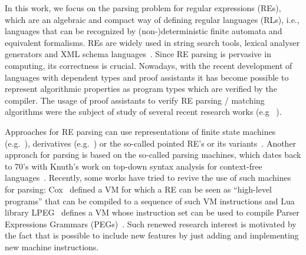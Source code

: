 \documentclass[review]{elsarticle}
\theoremstyle{definition}
\begin{document}
In this work, we focus on the parsing problem for regular expressions (REs), which are an algebraic
and compact way of defining regular languages (RLs), i.e., languages that can be recognized by
(non-)deterministic finite automata and equivalent formalisms. REs are widely used in string search
tools, lexical analyser generators and XML schema languages~\cite{Frisch2004}. Since RE parsing
is pervasive in computing, its correctness is crucial. Nowadays, with the recent
development of languages with dependent types and proof assistants it has become
possible to represent algorithmic properties as program types which are verified
by the compiler. The usage of proof assistants to verify RE parsing / matching algorithms
were the subject of study of several recent research works (e.g ~\cite{Firsov13,Ribeiro2017,Lopes2016,Asperti10}).

Approaches for RE parsing can use representations of finite state machines (e.g.~\cite{Firsov13}),
derivatives (e.g.~\cite{Ribeiro2017,Lopes2018,Lopes2016}) or the so-called pointed RE's or its
variants~\cite{Asperti10,Fischer2010}. Another approach for parsing is based on the so-called
parsing machines, which dates back to 70's with Knuth's work
on top-down syntax analysis for context-free languages~\cite{Knuth71}. Recently, some works
have tried to revive the use of such machines for parsing: Cox~\cite{Cox2009} defined a VM
for which a RE can be seen as ``high-level programs'' that can be compiled to a sequence of
such VM instructions and Lua library LPEG~\cite{Ierusalimschy2009} defines a VM whose instruction
set can be used to compile Parser Expressions Grammars (PEGs)~\cite{Ford04}. Such renewed research
interest is motivated by the fact that is possible to include new features by just adding and
implementing new machine instructions.
\end{document}
